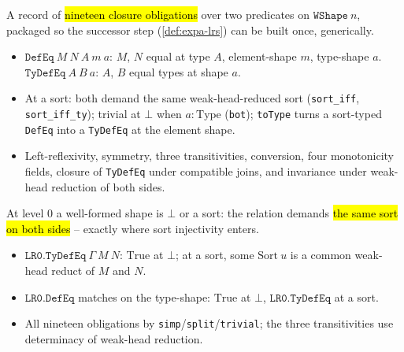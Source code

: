 \begin{definition}
\label{structure:expa-logrel}
\leanok
{}
 A record of \hl{nineteen closure obligations} over two predicates on
$\mathtt{WShape}\ n$, packaged so the successor step (\ref{def:expa-lrs}) can be built once,
generically.
\begin{itemize}
\item $\mathtt{DefEq}\ M\ N\ A\ m\ a$: $M$, $N$ equal at type $A$, element-shape $m$, type-shape $a$.
$\mathtt{TyDefEq}\ A\ B\ a$: $A$, $B$ equal types at shape $a$.
\item At a sort: both demand the same weak-head-reduced sort (\texttt{sort\_iff},
\texttt{sort\_iff\_ty}); trivial at $\bot$ when $a:\mathrm{Type}$ (\texttt{bot}); \texttt{toType}
turns a sort-typed \texttt{DefEq} into a \texttt{TyDefEq} at the element shape.
\item Left-reflexivity, symmetry, three transitivities, conversion, four monotonicity fields, closure
of \texttt{TyDefEq} under compatible joins, and invariance under weak-head reduction of both sides.
\end{itemize}
\end{definition}

\begin{definition}
\label{def:expa-lr0}
\leanok
{}

 At level $0$ a well-formed shape is $\bot$ or a sort: the relation demands \hl{the
same sort on both sides} -- exactly where sort injectivity enters.
\begin{itemize}
\item $\mathtt{LR0.TyDefEq}\ \Gamma\ M\ N$: $\mathrm{True}$ at $\bot$; at a sort, some
$\mathrm{Sort}\ u$ is a common weak-head reduct of $M$ and $N$.
\item $\mathtt{LR0.DefEq}$ matches on the type-shape: $\mathrm{True}$ at $\bot$,
$\mathtt{LR0.TyDefEq}$ at a sort.
\item All nineteen obligations by \texttt{simp}/\texttt{split}/\texttt{trivial}; the three
transitivities use determinacy of weak-head reduction.
\end{itemize}
\end{definition}

